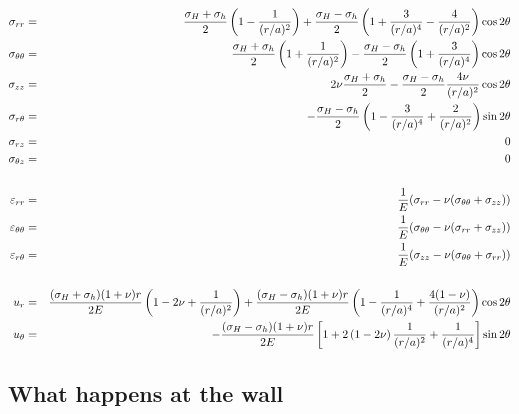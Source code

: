 \begin{mdframed}[backgroundcolor=blue!5]
\begin{eqnarray}
\sigma_{rr} &=& 
\frac{\sigma_H+\sigma_h}{2} \left(1-\frac{1}{(r/a)^2} \right)
+\frac{\sigma_H-\sigma_h}{2}  \left( 1 + \frac{3}{(r/a)^4} 
- \frac{4}{(r/a)^2}   \right) \cos 2\theta  \nonumber\\
\sigma_{\theta\theta}&=& 
\frac{\sigma_H+\sigma_h}{2} \left(1+\frac{1}{(r/a)^2} \right)
-\frac{\sigma_H-\sigma_h}{2} \left( 1 + \frac{3}{(r/a)^4}   \right) \cos 2\theta \nonumber\\
\sigma_{zz} &=& 
2\nu\frac{\sigma_H+\sigma_h}{2} 
 -\frac{\sigma_H-\sigma_h}{2} \frac{4 \nu}{(r/a)^2}   \cos 2\theta 
\nonumber\\
\sigma_{r\theta} &=&
-\frac{\sigma_H-\sigma_h}{2}  \left( 1 -  \frac{3}{(r/a)^4} + \frac{2}{(r/a)^2} \right) \sin 2\theta 
\nonumber\\
\sigma_{rz} &=& 0 \nonumber\\
\sigma_{\theta z} &=& 0 
\nonumber\\ 
\nonumber\\
\varepsilon_{rr}           &=& \frac{1}{E}(\sigma_{rr}-\nu(\sigma_{\theta\theta}+\sigma_{zz}) )\nonumber\\
\varepsilon_{\theta\theta} &=& \frac{1}{E}(\sigma_{\theta\theta}-\nu(\sigma_{rr}+\sigma_{zz}) )\nonumber\\
\varepsilon_{r\theta}      &=& \frac{1}{E}(\sigma_{zz}-\nu(\sigma_{\theta\theta}+\sigma_{rr}) )
\nonumber\\
\nonumber\\
u_r
&=& 
\frac{(\sigma_H+\sigma_h)(1+\nu)r}{2 E} \left(  1 -2\nu +\frac{1}{(r/a)^2} \right)   
+ \frac{(\sigma_H-\sigma_h)(1+\nu)r}{2E}
\left(  1 - \frac{1}{(r/a)^4} + \frac{4(1-\nu)}{(r/a)^2}  
\right) \cos 2\theta 
\nonumber\\
u_\theta
&=& 
-\frac{(\sigma_H-\sigma_h)(1+\nu) r}{2E}
\left[
1 +2\left( 1 - 2\nu \right)\frac{1}{(r/a)^2}
+ \frac{1}{(r/a)^4}
\right]  \sin 2\theta \nonumber
\end{eqnarray}
\end{mdframed}

\newpage
\subsection*{What happens at the wall}




